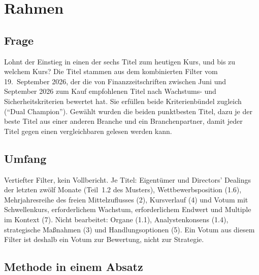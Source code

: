 \section*{Rahmen}
\label{sec:rahmen}

\subsection*{Frage}

Lohnt der Einstieg in einen der sechs Titel zum heutigen Kurs, und bis zu welchem
Kurs? Die Titel stammen aus dem kombinierten Filter vom 19.~September 2026, der
die \FilterTitel{} von Finanzzeitschriften zwischen Juni und September 2026 zum Kauf
empfohlenen Titel nach Wachstums- und Sicherheitskriterien bewertet hat. Sie
erf\"ullen beide Kriterienb\"undel zugleich (\enquote{Dual Champion}). Gew\"ahlt
wurden die beiden punktbesten Titel, dazu je der beste Titel aus einer anderen
Branche und ein Branchenpartner, damit jeder Titel gegen einen vergleichbaren
gelesen werden kann.


\subsection*{Umfang}

Vertiefter Filter, kein Vollbericht. Je Titel: Eigent\"umer und Directors'
Dealings der letzten zw\"olf Monate (Teil~1.2 des Musters), Wettbewerbsposition
(1.6), Mehrjahresreihe des freien Mittelzuflusses (2), Kursverlauf (4) und
Votum mit Schwellenkurs, erforderlichem Wachstum, erforderlichem Endwert und
Multiple im Kontext (7). Nicht bearbeitet: Organe (1.1), Analystenkonsens (1.4),
strategische Ma{\ss}nahmen (3) und Handlungsoptionen (5). Ein Votum aus diesem
Filter ist deshalb ein Votum zur Bewertung, nicht zur Strategie.

\subsection*{Methode in einem Absatz}
\label{sec:methode}

